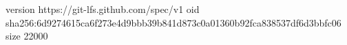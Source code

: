 version https://git-lfs.github.com/spec/v1
oid sha256:6d9274615ca6f273e4d9bbb39b841d873c0a01360b92fca838537df6d3bbfc06
size 22000
